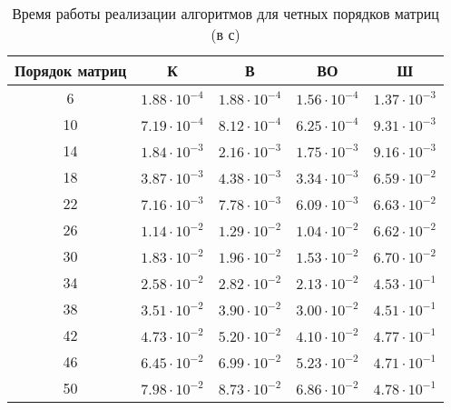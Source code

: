 \begin{table}[h]
	\begin{center}
		\begin{threeparttable}
			\captionsetup{justification=raggedright,singlelinecheck=off}
			\caption{Время работы реализации алгоритмов для четных порядков матриц (в с)}
			\label{tbl:time_measurements_even}
			\begin{tabular}{|c|c|c|c|c|}
				\hline
				Порядок матриц & К & В & ВО & Ш \\
				\hline
				6 &$ 1.88\cdot 10^{-4} $&$ 1.88\cdot 10^{-4} $&$ 1.56\cdot 10^{-4} $&$ 1.37\cdot 10^{-3}$\\
				\hline
				10 &$ 7.19\cdot 10^{-4} $&$ 8.12\cdot 10^{-4} $&$ 6.25\cdot 10^{-4} $&$ 9.31\cdot 10^{-3}$\\
				\hline
				14 &$ 1.84\cdot 10^{-3} $&$ 2.16\cdot 10^{-3} $&$ 1.75\cdot 10^{-3} $&$ 9.16\cdot 10^{-3}$\\
				\hline
				18 &$ 3.87\cdot 10^{-3} $&$ 4.38\cdot 10^{-3} $&$ 3.34\cdot 10^{-3} $&$ 6.59\cdot 10^{-2}$\\
				\hline
				22 &$ 7.16\cdot 10^{-3} $&$ 7.78\cdot 10^{-3} $&$ 6.09\cdot 10^{-3} $&$ 6.63\cdot 10^{-2}$\\
				\hline
				26 &$ 1.14\cdot 10^{-2} $&$ 1.29\cdot 10^{-2} $&$ 1.04\cdot 10^{-2} $&$ 6.62\cdot 10^{-2}$\\
				\hline
				30 &$ 1.83\cdot 10^{-2} $&$ 1.96\cdot 10^{-2} $&$ 1.53\cdot 10^{-2} $&$ 6.70\cdot 10^{-2}$\\
				\hline
				34 &$ 2.58\cdot 10^{-2} $&$ 2.82\cdot 10^{-2} $&$ 2.13\cdot 10^{-2} $&$ 4.53\cdot 10^{-1}$\\
				\hline
				38 &$ 3.51\cdot 10^{-2} $&$ 3.90\cdot 10^{-2} $&$ 3.00\cdot 10^{-2} $&$ 4.51\cdot 10^{-1}$\\
				\hline
				42 &$ 4.73\cdot 10^{-2} $&$ 5.20\cdot 10^{-2} $&$ 4.10\cdot 10^{-2} $&$ 4.77\cdot 10^{-1}$\\
				\hline
				46 &$ 6.45\cdot 10^{-2} $&$ 6.99\cdot 10^{-2} $&$ 5.23\cdot 10^{-2} $&$ 4.71\cdot 10^{-1}$\\
				\hline
				50 &$ 7.98\cdot 10^{-2} $&$ 8.73\cdot 10^{-2} $&$ 6.86\cdot 10^{-2} $&$ 4.78\cdot 10^{-1}$\\
				\hline
			\end{tabular}
		\end{threeparttable}
	\end{center}
\end{table}

